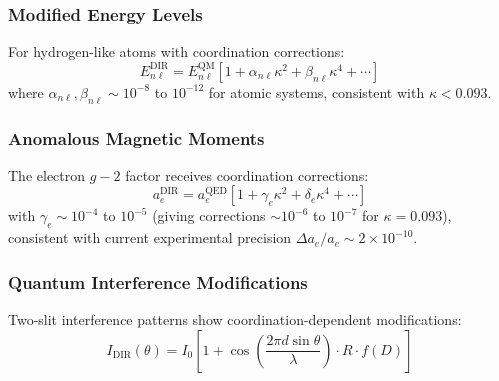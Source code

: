 \documentclass[11pt,a4paper]{article}
\begin{document}
	\subsubsection{Modified Energy Levels}
	For hydrogen-like atoms with coordination corrections:
	\begin{equation}
		E_{n\ell}^{\text{DIR}} = E_{n\ell}^{\text{QM}} \left[ 1 + \alpha_{n\ell} \kappa^2 + \beta_{n\ell} \kappa^4 + \cdots \right]
	\end{equation}
	where $\alpha_{n\ell}, \beta_{n\ell} \sim 10^{-8}$ to $10^{-12}$ for atomic systems, consistent with $\kappa < 0.093$.
	
	\subsubsection{Anomalous Magnetic Moments}
	The electron $g-2$ factor receives coordination corrections:
	\begin{equation}
		a_e^{\text{DIR}} = a_e^{\text{QED}} \left[ 1 + \gamma_e \kappa^2 + \delta_e \kappa^4 + \cdots \right]
	\end{equation}
	with $\gamma_e \sim 10^{-4}$ to $10^{-5}$ (giving corrections $\sim 10^{-6}$ to $10^{-7}$ for $\kappa=0.093$),
	consistent with current experimental precision $\Delta a_e/a_e \sim 2\times10^{-10}$.
	
	\subsubsection{Quantum Interference Modifications}
	Two-slit interference patterns show coordination-dependent modifications:
	\begin{equation}
		I_{\text{DIR}}(\theta) = I_0 \left[ 1 + \cos\left( \frac{2\pi d \sin\theta}{\lambda} \right) \cdot R \cdot f(D) \right]
	\end{equation}
	
\end{document}
